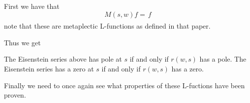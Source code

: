    First we have that 
    \[M(s, w)f = \frac{}{} f\]
    note that these are metaplectic L-functions as defined in that paper.

    Thus we get 
    \begin{Lemma}
        The Eisenstein series above has pole at \(s\) if and only if \(r(w,s)\) has a pole. The Eisenstein series has a zero at \(s\) if and only if \(r(w, s)\) has a zero.
     \end{Lemma}
     Finally we need to once again see what properties of these L-fuctions have been proven. 